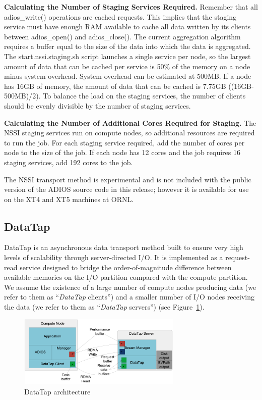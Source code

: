 \textbf{Calculating the Number of Staging Services Required.}  Remember that all 
adios\_write() operations are cached requests.  This implies that the staging service 
must have enough RAM available to cache all data written by its clients between 
adios\_open() and adios\_close().  The current aggregation algorithm requires a 
buffer equal to the size of the data into which the data is aggregated.  The start.nssi.staging.sh 
script launches a single service per node, so the largest amount of data that can 
be cached per service is 50\% of the memory on a node minus system overhead.  System 
overhead can be estimated at 500MB.  If a node has 16GB of memory, the amount of 
data that can be cached is 7.75GB ((16GB-500MB)/2).  To balance the load on the 
staging services, the number of clients should be evenly divisible by the number 
of staging services.

\textbf{Calculating the Number of Additional Cores Required for Staging.}  The 
NSSI staging services run on compute nodes, so additional resources are required 
to run the job.  For each staging service required, add the number of cores per 
node to the size of the job.  If each node has 12 cores and the job requires 16 
staging services, add 192 cores to the job.

The NSSI transport method is experimental and is not included with the public version 
of the ADIOS source code in this release; however it is available for use on the 
XT4 and XT5 machines at ORNL.

\subsection{DataTap}

DataTap is an asynchronous data transport method built to ensure very high levels 
of scalability through server-directed I/O. It is implemented as a request-read 
service designed to bridge the order-of-magnitude difference between available 
memories on the I/O partition compared with the compute partition. We assume the 
existence of a large number of compute nodes producing data (we refer to them as 
``\textit{DataTap }clients'') and a smaller number of I/O nodes receiving the data 
(we refer to them as ``\textit{DataTap }servers'') (see Figure~\ref{fig:datatap-arch}). 

\begin{figure}[htbp]
\begin{center}
\includegraphics[width=222pt, height=97pt]{figures/datatap-architecture.png}
\caption{DataTap architecture}
\label{fig:datatap-arch}
\end{center}
\end{figure}


